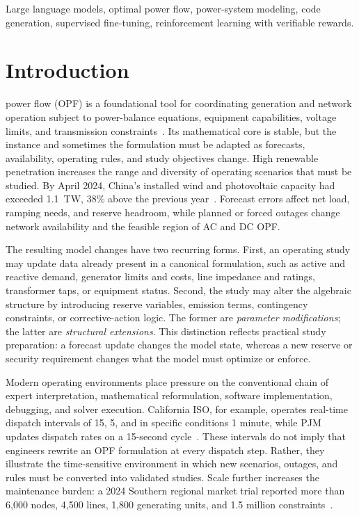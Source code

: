 \documentclass[lettersize,journal]{IEEEtran}
\begin{document}
\begin{IEEEkeywords}
Large language models, optimal power flow, power-system modeling, code generation, supervised fine-tuning, reinforcement learning with verifiable rewards.
\end{IEEEkeywords}

\section{Introduction}
 power flow (OPF) is a foundational tool for coordinating generation and network operation subject to power-balance equations, equipment capabilities, voltage limits, and transmission constraints~\cite{carpentier1962contribution,wang2023ac}. Its mathematical core is stable, but the instance and sometimes the formulation must be adapted as forecasts, availability, operating rules, and study objectives change. High renewable penetration increases the range and diversity of operating scenarios that must be studied. By April 2024, China's installed wind and photovoltaic capacity had exceeded 1.1~TW, 38\% above the previous year~\cite{nea2024consumption}. Forecast errors affect net load, ramping needs, and reserve headroom, while planned or forced outages change network availability and the feasible region of AC and DC OPF.

The resulting model changes have two recurring forms. First, an operating study may update data already present in a canonical formulation, such as active and reactive demand, generator limits and costs, line impedance and ratings, transformer taps, or equipment status. Second, the study may alter the algebraic structure by introducing reserve variables, emission terms, contingency constraints, or corrective-action logic. The former are \emph{parameter modifications}; the latter are \emph{structural extensions}. This distinction reflects practical study preparation: a forecast update changes the model state, whereas a new reserve or security requirement changes what the model must optimize or enforce.

Modern operating environments place pressure on the conventional chain of expert interpretation, mathematical reformulation, software implementation, debugging, and solver execution. California ISO, for example, operates real-time dispatch intervals of 15, 5, and in specific conditions 1 minute, while PJM updates dispatch rates on a 15-second cycle~\cite{caisoRealtime,pjmDispatch}. These intervals do not imply that engineers rewrite an OPF formulation at every dispatch step. Rather, they illustrate the time-sensitive environment in which new scenarios, outages, and rules must be converted into validated studies. Scale further increases the maintenance burden: a 2024 Southern regional market trial reported more than 6,000 nodes, 4,500 lines, 1,800 generating units, and 1.5 million constraints~\cite{neaSouthernMarket}.
\end{document}
